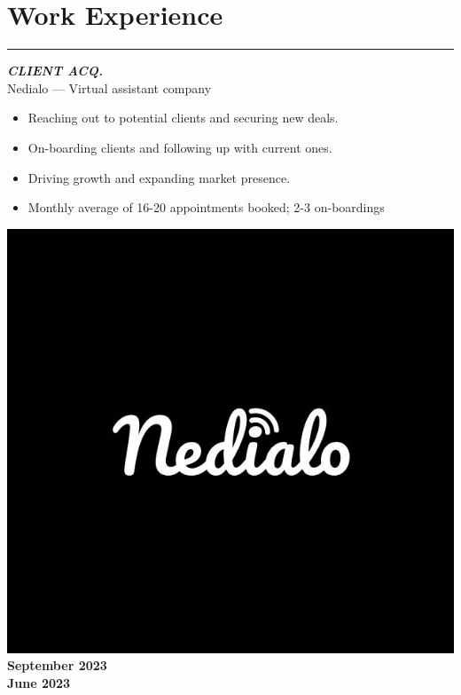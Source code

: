 \documentclass[10pt]{article}
\newcommand{\fancy}[1]{\Large\textbf{\textit{#1}}}
\begin{document}

\section*{Work Experience}
\hrule
\vspace{3em}

\begin{minipage}{0.75\textwidth}
 \fancy{CLIENT ACQ.} \\
{\large Nedialo --- Virtual assistant company} \\
\begin{itemize}
    \item Reaching out to potential clients and securing new deals.
    \item On-boarding clients and following up with current ones.
    \item Driving growth and expanding market presence.
    \item Monthly average of 16-20 appointments booked; 2-3 on-boardings
\end{itemize}   
\end{minipage}
\hspace{10pt}
\begin{minipage}{0.2\textwidth}
\begin{center}
\vspace{20pt}
\includegraphics[width=\textwidth]{nedialo-black.jpg} \\
    \large\textbf{September 2023\\June 2023} %
\end{center}
\end{minipage} %
\end{document}
